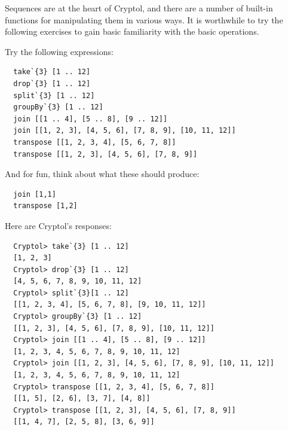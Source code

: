 Sequences are at the heart of Cryptol, and there are a number of
built-in functions for manipulating them in various ways.  It is
worthwhile to try the following exercises to gain basic familiarity
with the basic operations.

\begin{Exercise}\label{ex:seq:11}
Try the following expressions:\indTake\indDrop\indSplitBy\indGroup\indJoin\indTranspose
\begin{Verbatim}
  take`{3} [1 .. 12]
  drop`{3} [1 .. 12]
  split`{3} [1 .. 12]
  groupBy`{3} [1 .. 12]
  join [[1 .. 4], [5 .. 8], [9 .. 12]]
  join [[1, 2, 3], [4, 5, 6], [7, 8, 9], [10, 11, 12]]
  transpose [[1, 2, 3, 4], [5, 6, 7, 8]]
  transpose [[1, 2, 3], [4, 5, 6], [7, 8, 9]]
\end{Verbatim}
And for fun, think about what these should produce:
\begin{Verbatim}
  join [1,1]
  transpose [1,2]
\end{Verbatim}
\end{Exercise}
\begin{Answer}
Here are Cryptol's responses:
\begin{Verbatim}
  Cryptol> take`{3} [1 .. 12]
  [1, 2, 3]
  Cryptol> drop`{3} [1 .. 12]
  [4, 5, 6, 7, 8, 9, 10, 11, 12]
  Cryptol> split`{3}[1 .. 12]
  [[1, 2, 3, 4], [5, 6, 7, 8], [9, 10, 11, 12]]
  Cryptol> groupBy`{3} [1 .. 12]
  [[1, 2, 3], [4, 5, 6], [7, 8, 9], [10, 11, 12]]
  Cryptol> join [[1 .. 4], [5 .. 8], [9 .. 12]]
  [1, 2, 3, 4, 5, 6, 7, 8, 9, 10, 11, 12]
  Cryptol> join [[1, 2, 3], [4, 5, 6], [7, 8, 9], [10, 11, 12]]
  [1, 2, 3, 4, 5, 6, 7, 8, 9, 10, 11, 12]
  Cryptol> transpose [[1, 2, 3, 4], [5, 6, 7, 8]]
  [[1, 5], [2, 6], [3, 7], [4, 8]]
  Cryptol> transpose [[1, 2, 3], [4, 5, 6], [7, 8, 9]]
  [[1, 4, 7], [2, 5, 8], [3, 6, 9]]
\end{Verbatim}
\end{Answer}

